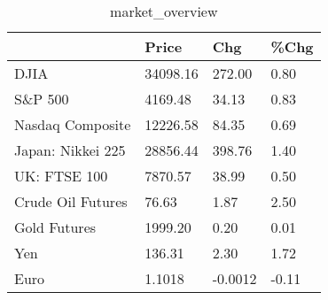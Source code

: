 \documentclass{article}%
\begin{document}
%


\begin{table}[htbp]%
\caption{market\_overview}%
\centering%
\begin{adjustbox}{width=1\textwidth}%
\begin{tabular}{llll}
\toprule
                  &    Price &     Chg &  \%Chg \\
\midrule
             DJIA & 34098.16 &  272.00 &  0.80 \\
          S\&P 500 &  4169.48 &   34.13 &  0.83 \\
 Nasdaq Composite & 12226.58 &   84.35 &  0.69 \\
Japan: Nikkei 225 & 28856.44 &  398.76 &  1.40 \\
     UK: FTSE 100 &  7870.57 &   38.99 &  0.50 \\
Crude Oil Futures &    76.63 &    1.87 &  2.50 \\
     Gold Futures &  1999.20 &    0.20 &  0.01 \\
              Yen &   136.31 &    2.30 &  1.72 \\
             Euro &   1.1018 & -0.0012 & -0.11 \\
\bottomrule
\end{tabular}
%
\end{adjustbox}%
\end{table}

%
\end{document}
